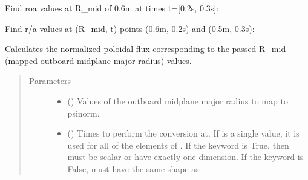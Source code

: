 \documentclass[letterpaper,10pt,english]{sphinxmanual}
\begin{document}
\begin{fulllineitems}
\begin{fulllineitems}
Find roa values at R\_mid of 0.6m at times t={[}0.2s, 0.3s{]}:

\begin{sphinxVerbatim}[commandchars=\\\{\}]
   \PYG{p}{[} \PYG{p}{]}
\end{sphinxVerbatim}

Find r/a values at (R\_mid, t) points (0.6m, 0.2s) and (0.5m, 0.3s):

\begin{sphinxVerbatim}[commandchars=\\\{\}]
  \PYG{p}{[} \PYG{p}{]} \PYG{p}{[} \PYG{p}{]} 
\end{sphinxVerbatim}

\end{fulllineitems}


\begin{fulllineitems}
\label{\detokenize{eqtools:eqtools.core.Equilibrium.rmid2psinorm}}
Calculates the normalized poloidal flux corresponding to the passed R\_mid (mapped outboard midplane major radius) values.
\begin{quote}\begin{description}
\item[{Parameters}] \leavevmode\begin{itemize}
\item {} 
 () \textendash{} Values of the outboard midplane
major radius to map to psinorm.

\item {} 
 () \textendash{} Times to perform the conversion at.
If  is a single value, it is used for all of the elements of
. If the  keyword is True, then  must be scalar
or have exactly one dimension. If the  keyword is False,
 must have the same shape as .


\end{itemize}
\end{description}
\end{quote}
\end{fulllineitems}
\end{fulllineitems}
\end{document}
